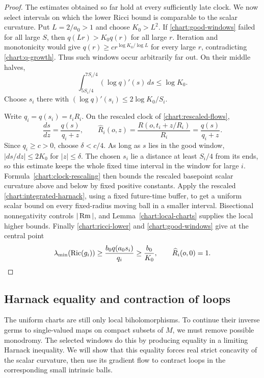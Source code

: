 \begin{proof}
The estimates obtained so far hold at every sufficiently late clock.
We now select intervals on which the lower Ricci bound is comparable
to the scalar curvature.  Put $L=2/a_0>1$ and choose $K_0>L^2$.  If
\eqref{chart:good-windows} failed for all large $S$, then
$q(Lr)>K_0q(r)$ for all large $r$.  Iteration and monotonicity
would give $q(r)\ge cr^{\log K_0/\log L}$ for every large $r$,
contradicting \eqref{chart:q-growth}.  Thus such windows occur
arbitrarily far out.  On their middle halves,
\[
 \int_{5S_i/4}^{7S_i/4}(\log q)'(s)\,ds\le\log K_0.
\]
Choose $s_i$ there with
$(\log q)'(s_i)\le2\log K_0/S_i$.

Write $q_i=q(s_i)=t_iR_i$.  On the rescaled clock of
\eqref{chart:rescaled-flows},
\begin{equation}\label{chart:clock-rescaling}
 \frac{ds}{dz}=\frac{q(s)}{q_i+z},\qquad
 \widehat R_i(o,z)=\frac{R(o,t_i+z/R_i)}{R_i}
                 =\frac{q(s)}{q_i+z}.
\end{equation}
Since $q_i\ge c>0$, choose $\delta<c/4$.  As long as $s$ lies
in the good window, $|ds/dz|\le2K_0$ for $|z|\le\delta$.
The chosen $s_i$ lie a distance at least $S_i/4$ from its ends,
so this estimate keeps the whole fixed time interval in the
window for large $i$.  Formula~\eqref{chart:clock-rescaling}
then bounds the rescaled basepoint scalar curvature above and
below by fixed positive constants.  Apply the rescaled
\eqref{chart:integrated-harnack}, using a fixed future-time
buffer, to get a uniform scalar bound on every fixed-radius
moving ball in a smaller interval.  Bisectional nonnegativity
controls $|\operatorname{Rm}|$, and Lemma~\ref{chart:local-charts} supplies
the local higher bounds.  Finally
\eqref{chart:ricci-lower} and \eqref{chart:good-windows} give
at the central point
\[
 \lambda_{\min}(\operatorname{Ric}(g_i))
 \ge\frac{b_0q(a_0s_i)}{q_i}\ge\frac{b_0}{K_0},
 \qquad \widehat R_i(o,0)=1.
\]
\end{proof}

\subsection{Harnack equality and contraction of loops}

The uniform charts are still only local biholomorphisms.  To continue
their inverse germs to single-valued maps on compact subsets of $M$,
we must remove possible monodromy.  The selected windows do this by
producing equality in a limiting Harnack inequality.  We will show
that this equality forces real strict concavity of the scalar
curvature, then use its gradient flow to contract loops in the
corresponding small intrinsic balls.

